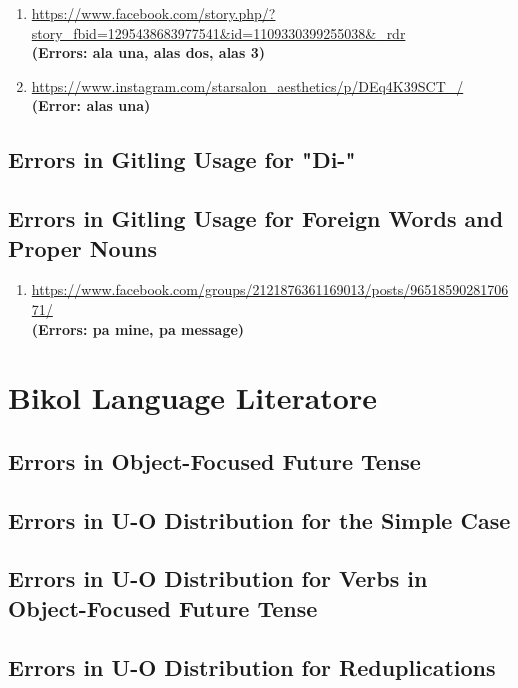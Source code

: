 \begin{enumerate}
    \item \url{https://www.facebook.com/story.php/?story_fbid=1295438683977541&id=1109330399255038&_rdr} \\
    \textbf{(Errors: ala una, alas dos, alas 3)}
    \item \url{https://www.instagram.com/starsalon_aesthetics/p/DEq4K39SCT_/} \\
    \textbf{(Error: alas una)}
\end{enumerate}

\subsection{Errors in Gitling Usage for "Di-"}
\subsection{Errors in Gitling Usage for Foreign Words and Proper Nouns}

\begin{enumerate}
    \item \url{https://www.facebook.com/groups/2121876361169013/posts/9651859028170671/} \\
    \textbf{(Errors: pa mine, pa message)}
\end{enumerate}


\section{Bikol Language Literatore}
\subsection{Errors in Object-Focused Future Tense}
\subsection{Errors in U-O Distribution for the Simple Case}
\subsection{Errors in U-O Distribution for Verbs in Object-Focused Future Tense}
\subsection{Errors in U-O Distribution for Reduplications}